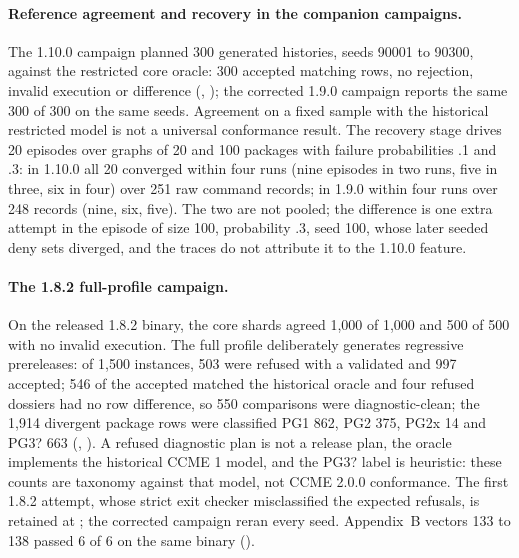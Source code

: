 \paragraph{Reference agreement and recovery in the companion campaigns.} The
1.10.0 campaign planned 300 generated histories, seeds 90001 to 90300, against
the restricted core oracle: 300 accepted matching rows, no rejection, invalid
execution or difference (,
); the corrected 1.9.0 campaign reports the same 300 of 300 on the
same seeds. Agreement on a fixed sample with the historical restricted model
is not a universal conformance result. The recovery stage drives 20 episodes
over graphs of 20 and 100 packages with failure probabilities .1 and .3: in
1.10.0 all 20 converged within four runs (nine episodes in two runs, five in
three, six in four) over 251 raw command records; in 1.9.0 within four runs
over 248 records (nine, six, five). The two are not pooled; the difference
is one extra attempt in the episode of size 100, probability .3, seed 100,
whose later seeded deny sets diverged, and the traces do not attribute it to
the 1.10.0 feature.

\paragraph{The 1.8.2 full-profile campaign.} On the released 1.8.2 binary, the
core shards agreed 1,000 of 1,000 and 500 of 500 with no invalid execution.
The full profile deliberately generates regressive prereleases: of 1,500
instances, 503 were refused with a validated  and 997 accepted; 546
of the accepted matched the historical oracle and four refused dossiers had no
row difference, so 550 comparisons were diagnostic-clean; the 1,914 divergent
package rows were classified PG1 862, PG2 375, PG2x 14 and PG3? 663
(, ). A refused
diagnostic plan is not a release plan, the oracle implements the historical
CCME 1 model, and the PG3? label is heuristic: these counts are taxonomy
against that model, not CCME 2.0.0 conformance. The first 1.8.2 attempt, whose
strict exit checker misclassified the expected refusals, is retained at
; the corrected campaign
reran every seed. Appendix~B vectors 133 to 138 passed 6 of 6 on the same
binary ().

